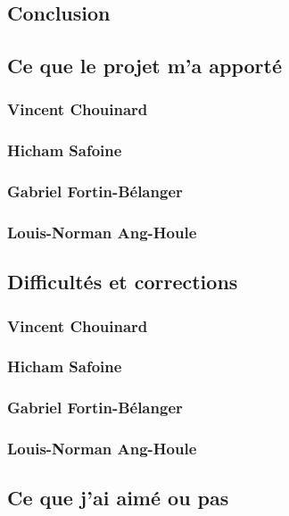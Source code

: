 \documentclass[10pt,a4paper,final]{article}
\begin{document}
\begin{spacing}{1.5}
\section{Conclusion}

\subsection{Ce que le projet m'a apporté}
\subsubsection{Vincent Chouinard}

\subsubsection{Hicham Safoine}

\subsubsection{Gabriel Fortin-Bélanger}

\subsubsection{Louis-Norman Ang-Houle}



\subsection{Difficultés et corrections}
\subsubsection{Vincent Chouinard}

\subsubsection{Hicham Safoine}

\subsubsection{Gabriel Fortin-Bélanger}

\subsubsection{Louis-Norman Ang-Houle}


\subsection{Ce que j'ai aimé ou pas}

\end{spacing}
\end{document}
